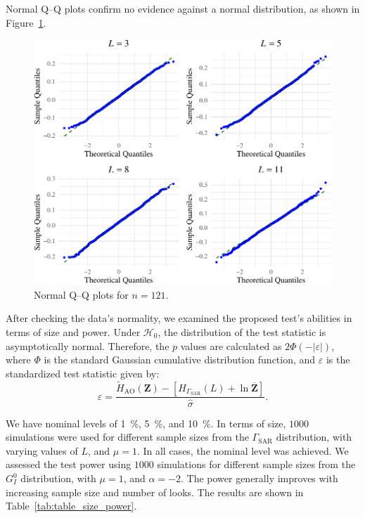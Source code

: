 Normal Q--Q plots confirm no evidence against a normal distribution, as
shown in Figure~\ref{fig:Plot_normality_qq}.
\begin{figure}[H]
\includegraphics[width=0.9\linewidth]{../../Figures/PDF/Plot_normality_qq-1} \caption{Normal Q--Q plots for  $n=121$.}\label{fig:Plot_normality_qq}
\end{figure}

After checking the data's normality, we examined the proposed test's
abilities in terms of size and power. Under \(\mathcal{H}_0\), the
distribution of the test statistic is asymptotically normal. Therefore,
the \(p\) values are calculated as \(2\Phi(-|\varepsilon|)\), where
\(\Phi\) is the standard Gaussian cumulative distribution function, and
\(\varepsilon\) is the standardized test statistic given by: \[
\varepsilon=\frac{\widetilde{H}_{\text{AO}}(\bm{Z})-\left[H_{\Gamma_{\text{SAR}}}(L)+\ln \overline{\bm{Z}}\right]}{\widehat\sigma}.
\]

We have nominal levels of \SI{1}{\percent}, \SI{5}{\percent}, and
\SI{10}{\percent}. In terms of size, \(1000\) simulations were used for
different sample sizes from the \(\Gamma_{\text{SAR}}\) distribution,
with varying values of \(L\), and \(\mu=1\). In all cases, the nominal
level was achieved. We assessed the test power using \(1000\)
simulations for different sample sizes from the \(G_I^0\) distribution,
with \(\mu=1\), and \(\alpha=-2\). The power generally improves with
increasing sample size and number of looks. The results are shown in
Table~\ref{tab:table_size_power}.


